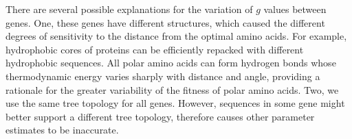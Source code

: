There are several possible explanations for the variation of $g$ values between genes. 
One, these genes have different structures, which caused the different degrees of sensitivity to the distance from the optimal amino acids. 
For example, hydrophobic cores of proteins can be efficiently repacked with different hydrophobic sequences. All polar amino acids can form hydrogen bonds whose thermodynamic energy varies sharply with distance and angle, providing a rationale for the greater variability of the fitness of polar amino acids.
Two, we use the same tree topology for all genes. However, sequences in some gene might better support a different  tree topology, therefore causes other parameter estimates to be inaccurate.\\


%


